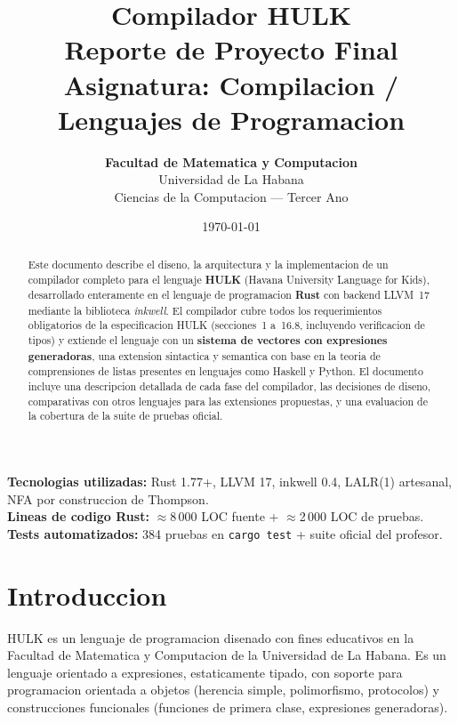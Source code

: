 \documentclass[12pt,a4paper]{article}
\title{
  \vspace{-1cm}
  \Huge\textbf{Compilador HULK}\\[0.5em]
  \large Reporte de Proyecto Final\\[0.3em]
  \large Asignatura: Compilacion / Lenguajes de Programacion
}
\author{
  \textbf{Facultad de Matematica y Computacion}\\
  Universidad de La Habana\\[1em]
  Ciencias de la Computacion --- Tercer Ano
}
\date{\today}
\begin{document}

\maketitle
\thispagestyle{empty}
\vspace{2cm}

\begin{abstract}
\noindent
Este documento describe el diseno, la arquitectura y la implementacion de un compilador
completo para el lenguaje \textbf{HULK} (Havana University Language for Kids), desarrollado
enteramente en el lenguaje de programacion \textbf{Rust} con backend LLVM~17 mediante la
biblioteca \textit{inkwell}. El compilador cubre todos los requerimientos obligatorios de la
especificacion HULK (secciones~1 a~16.8, incluyendo verificacion de tipos) y extiende el
lenguaje con un \textbf{sistema de vectores con expresiones generadoras}, una extension
sintactica y semantica con base en la teoria de comprensiones de listas presentes en
lenguajes como Haskell y Python. El documento incluye una descripcion detallada de cada
fase del compilador, las decisiones de diseno, comparativas con otros lenguajes para las
extensiones propuestas, y una evaluacion de la cobertura de la suite de pruebas oficial.
\end{abstract}

\vfill
\begin{mdframed}
\small
\textbf{Tecnologias utilizadas:} Rust 1.77+, LLVM 17, inkwell 0.4, LALR(1) artesanal,
NFA por construccion de Thompson.\\
\textbf{Lineas de codigo Rust:} $\approx$8\,000 LOC fuente + $\approx$2\,000 LOC de pruebas.\\
\textbf{Tests automatizados:} 384 pruebas en \texttt{cargo test} + suite oficial del profesor.
\end{mdframed}

\newpage
\tableofcontents
\newpage

\section{Introduccion}

HULK es un lenguaje de programacion disenado con fines educativos en la Facultad de
Matematica y Computacion de la Universidad de La Habana. Es un lenguaje orientado a
expresiones, estaticamente tipado, con soporte para programacion orientada a objetos
(herencia simple, polimorfismo, protocolos) y construcciones funcionales (funciones de
primera clase, expresiones generadoras).
\end{document}
